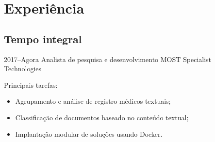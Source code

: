 \documentclass[a4paper]{cv-friggeri-x}
\begin{document}




\section{Experiência}

\subsection{Tempo integral}

\begin{entrylist}


\entry
    {2017--Agora}
    {Analista de pesquisa e desenvolvimento}
    {MOST Specialist Technologies}
    {Principais tarefas:
    \begin{itemize}
        \item Agrupamento e análise de registro médicos textuais;
        \item Classificação de documentos baseado no conteúdo textual;
        \item Implantação modular de soluções usando Docker.
    \end{itemize}}


\end{entrylist}
\end{document}
